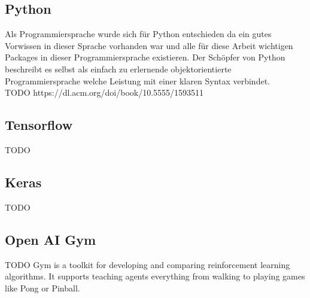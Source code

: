 \subsection{Python}
Als Programmiersprache wurde sich für Python entschieden da ein gutes Vorwissen in dieser Sprache vorhanden war und alle für diese Arbeit wichtigen Packages in dieser Programmiersprache existieren.
Der Schöpfer von Python beschreibt es selbst als einfach zu erlernende objektorientierte Programmiersprache welche Leistung mit einer klaren Syntax verbindet.\\
\colorbox{red!30}{TODO https://dl.acm.org/doi/book/10.5555/1593511}

\subsection{Tensorflow}
\colorbox{red!30}{TODO}

\subsection{Keras}
\colorbox{red!30}{TODO}

\subsection{Open AI Gym}
\colorbox{red!30}{TODO Gym is a toolkit for developing and comparing reinforcement learning algorithms. It supports teaching agents everything from walking to playing games like Pong or Pinball.}
